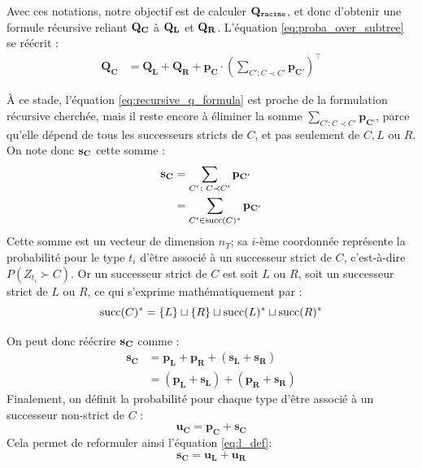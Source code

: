 Avec ces notations, notre objectif est de calculer $\bf{Q_\texttt{racine}}$, et donc d'obtenir une formule récursive reliant $\bf{Q_C}$ à $\bf{Q_L}$ et $\bf{Q_R}$. L'équation \ref{eq:proba_over_subtree} se réécrit :
\begin{align}
    \mathbf{Q_C} &= \mathbf{Q_L} + \mathbf{Q_R} + \mathbf{p_C} \cdot \left(\sum_{C' \colon C \prec C'} \mathbf{p_{C'}} \right)^\top 
    \label{eq:recursive_q_formula}
\end{align}

À ce stade, l'équation \ref{eq:recursive_q_formula} est proche de la formulation récursive cherchée, mais il reste encore à éliminer la somme $\sum_{C' \colon C \prec C'} \mathbf{p_{C'}}$, parce qu'elle dépend de tous les successeurs stricts de $C$, et pas seulement de $C, L$ ou $R$. On note donc $\bf{s_C}$ cette somme :
\begin{align}
    \bf{s_C} &= \sum_{C' \colon C \prec C'} \mathbf{p_{C'}} \nonumber \\
            &= \sum_{C' \in \succs(C)^*} \mathbf{p_{C'}}
\end{align}
Cette somme est un vecteur de dimension $n_T$; sa $i$-ème coordonnée représente la probabilité pour le type $t_i$ d'être associé à un successeur strict de $C$, c'est-à-dire $P(Z_{t_i} \succ C)$. Or un successeur strict de $C$ est soit $L$ ou $R$, soit un successeur strict de $L$ ou $R$, ce qui s'exprime mathématiquement par :
\begin{equation}
    \succs(C)^* = \{L\} \sqcup \{R\} \sqcup \succs(L)^* \sqcup \succs(R)^*
\end{equation}

On peut donc réécrire $\bf{s_C}$ comme :
\begin{align}
    \mathbf{s_C} &= \mathbf{p_L} + \mathbf{p_R} + (\mathbf{s_L} + \mathbf{s_R}) \nonumber  \\
     &= (\mathbf{p_L}  + \mathbf{s_L}) + (\mathbf{p_R} + \mathbf{s_R})
    \label{eq:l_def}
\end{align}
Finalement, on définit la probabilité pour chaque type d'être associé à un successeur non-strict de $C$ : 
\begin{equation}
    \mathbf{u_C} = \mathbf{p_C} + \mathbf{s_C}
    \label{eq:def_uc}
\end{equation}
Cela permet de reformuler ainsi l'équation \ref{eq:l_def}:
\begin{equation}
    \mathbf{s_C} = \mathbf{u_L} + \mathbf{u_R}
    \label{eq:l_update}
\end{equation}

